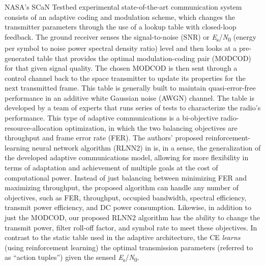 \documentclass[journal]{IEEEtran}
\begin{document}
NASA's SCaN Testbed experimental state-of-the-art communication system consists of an adaptive coding and modulation scheme, which changes the transmitter parameters through the use of a lookup table with closed-loop feedback.  The ground receiver senses the signal-to-noise (SNR) or \textit{E}\textsubscript{s}/\textit{N}\textsubscript{0} (energy per symbol to noise power spectral density ratio) level and then looks at a pre-generated table that provides the optimal modulation-coding pair (MODCOD) for that given signal quality.  The chosen MODCOD is then sent through a control channel back to the space transmitter to update its properties for the next transmitted frame.  This table is generally built to maintain quasi-error-free performance in an additive white Gaussian noise (AWGN) channel.  The table is developed by a team of experts that runs series of tests to characterize the radio's performance.  This type of adaptive communications is a bi-objective radio-resource-allocation optimization, in which the two balancing objectives are throughput and frame error rate (FER).  The authors' proposed reinforcement-learning neural network algorithm (RLNN2) in \cite{paulo-jrnl} is, in a sense, the generalization of the developed adaptive communications model, allowing for more flexibility in terms of adaptation and achievement of multiple goals at the cost of computational power.  Instead of just balancing between minimizing FER and maximizing throughput, the proposed algorithm can handle any number of objectives, such as FER, throughput, occupied bandwidth, spectral efficiency, transmit power efficiency, and DC power consumption.  Likewise, in addition to just the MODCOD, our proposed RLNN2 algorithm has the ability to change the transmit power, filter roll-off factor, and symbol rate to meet these objectives.  In contrast to the static table used in the adaptive architecture, the CE \textit{learns} (using reinforcement learning) the optimal transmission parameters (referred to as ``action tuples'') given the sensed \textit{E}\textsubscript{s}/\textit{N}\textsubscript{0}.
\end{document}
